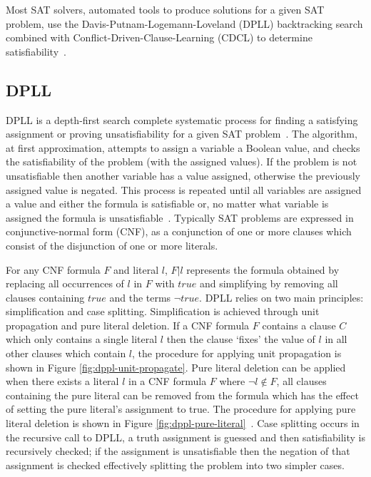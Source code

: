 \documentclass[]{final_report}
\begin{document}
Most SAT solvers, automated tools to produce solutions for a given SAT problem, use the Davis-Putnam-Logemann-Loveland (DPLL) backtracking search combined with Conflict-Driven-Clause-Learning (CDCL) to determine satisfiability~\cite{zhang2001efficient, gomes2008satisfiability}.

\subsection{DPLL}
DPLL is a depth-first search complete systematic process for finding a satisfying assignment or proving unsatisfiability for a given SAT problem~\cite{Davis:1962:MPT:368273.368557}. The algorithm, at first approximation, attempts to assign a variable a Boolean value, and checks the satisfiability of the problem (with the assigned values). If the problem is not unsatisfiable then another variable has a value assigned, otherwise the previously assigned value is negated. This process is repeated until all variables are assigned a value and either the formula is satisfiable or, no matter what variable is assigned the formula is unsatisfiable~\cite{sattosmt}. Typically SAT problems are expressed in conjunctive-normal form (CNF), as a conjunction of one or more clauses which consist of the disjunction of one or more literals. 

For any CNF formula $F$ and literal $l$, $\mathit{F}|l$ represents the formula obtained by replacing all occurrences of $l$ in $F$ with $true$ and simplifying by removing all clauses containing $true$ and the terms $\lnot{true}$. DPLL relies on two main principles: simplification and case splitting. Simplification is achieved through unit propagation and pure literal deletion. If a CNF formula $\mathit{F}$ contains a clause $C$ which only contains a single literal $l$ then the clause `fixes' the value of $l$ in all other clauses which contain $l$, the procedure for applying unit propagation is shown in Figure \ref{fig:dppl-unit-propagate}. Pure literal deletion can be applied when there exists a literal $l$ in a CNF formula $\mathit{F}$ where $\lnot{l} \notin \mathit{F}$, all clauses containing the pure literal can be removed from the formula which has the effect of setting the pure literal's assignment to true. The procedure for applying pure literal deletion is shown in Figure \ref{fig:dppl-pure-literal}~\cite{dpll-worksheet,dpll-method}. Case splitting occurs in the recursive call to DPLL, a truth assignment is guessed and then satisfiability is recursively checked; if the assignment is unsatisfiable then the negation of that assignment is checked effectively splitting the problem into two simpler cases.
\end{document}
